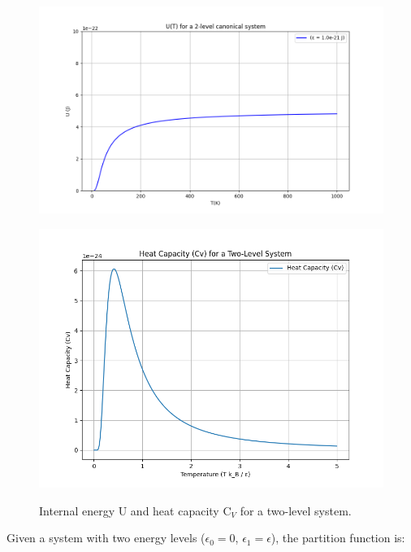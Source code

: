 \documentclass{article}
\begin{document}
\begin{figure}[h!]
    \centering
    \begin{minipage}{0.45\textwidth}
        \centering
        \includegraphics[width=\textwidth]{images/statistical-physics/u-canonical-2-levels.png}
        \label{fig:image1}
    \end{minipage}
    \hfill
    \begin{minipage}{0.45\textwidth}
        \centering
        \includegraphics[width=\textwidth]{images/statistical-physics/cv-canonical-2-levels.png}
        \label{fig:image2}
    \end{minipage}
    \caption{
        Internal energy U and heat capacity C$_V$ for a two-level system.
    }
    \label{fig:spin-system}
\end{figure}

Given a system with two energy levels ($\epsilon_0=0$, $\epsilon_1=\epsilon$), the partition function is:
\end{document}
